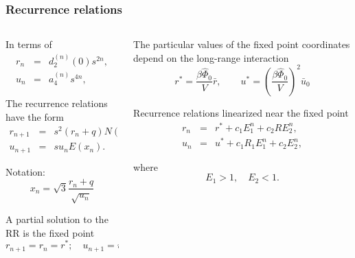 \documentclass[8pt]{beamer}
\begin{document}
	\begin{frame}
		\frametitle{Recurrence relations}
		
		\begin{columns}
			
			\begin{column}{0.5\textwidth}
				
			
		
		In terms of
		\begin{eqnarray*}
			r_n & = & d_2^{(n)}(0)s^{2n},
			\\
			u_n & = & a_4^{(n)}s^{4n},
		\end{eqnarray*}
		
		The recurrence relations have the form
		\begin{eqnarray*}
			r_{n+1} & = & s^2(r_n + q) N(x_n) - s^2 q;
			\nonumber\\
			u_{n+1} & = & s u_n E(x_n).
		\end{eqnarray*}
		
		Notation:
			\begin{equation*}
				x_n = \sqrt{3}\frac{r_n + q}{\sqrt{u_n}}
			\end{equation*}
			
			\vspace{10mm}
		
		A partial solution to the RR is the fixed point
		\begin{equation*}
			r_{n+1} = r_n = r^*; \quad u_{n+1} = u_n = u^*
		\end{equation*}
		
		\end{column}
		
		\begin{column}{0.5\textwidth}
			
			The particular values of the fixed point coordinates depend on the long-range interaction
			\begin{equation*}
				r^* = \frac{\beta\hat{\Phi}_0}{V} \bar{r}, 
				\qquad 
				u^* = \left(\frac{\beta\hat{\Phi}_0}{V}\right)^2 \bar{u}_0
			\end{equation*}
			
			Recurrence relations linearized near the fixed point
			\begin{eqnarray*}
				r_n & = & r^* + c_1 E_1^n + c_2 R E_2^n,
				\nonumber \\
				u_n & = & u^* + c_1 R_1 E_1^n + c_2 E_2^n,
			\end{eqnarray*}
			
		where
		\begin{equation*}
			E_1>1, \quad E_2<1.
		\end{equation*}
			
		\end{column}
		
		\end{columns}
	\end{frame}
	
\end{document}
